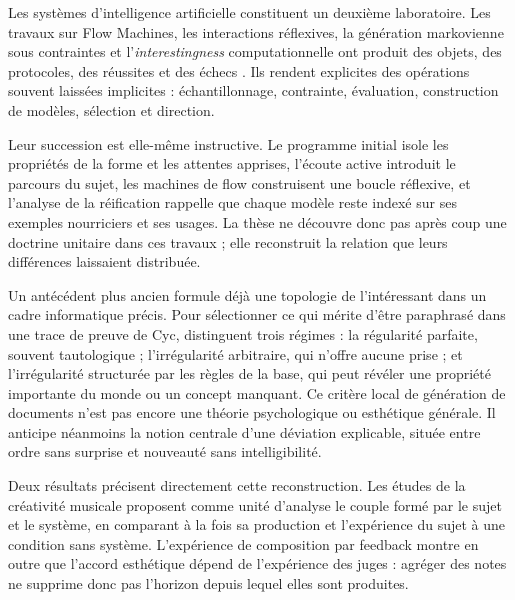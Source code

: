 \documentclass[11pt,a4paper]{article}
\begin{document}
Les systèmes d'intelligence artificielle constituent un deuxième laboratoire.
Les travaux sur Flow Machines, les interactions réflexives, la génération
markovienne sous contraintes et l'\emph{interestingness} computationnelle ont
produit des objets, des protocoles, des réussites et des échecs
\parencite{pachet1999surprising,pachet1999active,pachet1999programs,pachet2000melodie,
pachet2002continuatorinteraction,pachet2004flowmachines,pachet2004reification,
pachet2004cybernetic,pachet2004childrenreflect,addessi2005experiments,
pachet2006clefs,pachet2006creativity,pachet2006reflective,pachet2008machines,
jones2009stimulating,pachet2006interactionsreflexives,addessi2006flowmachine,
aucouturier2002similarity,pachetroy2008hitsong,pachet2011hitsong,
lerch2011closedloop,
milipachet1995regularity,pachet2012virtuosity,martin2016creativeprocess,
pachet2021assisted,pachet2026markov}.
Ils rendent explicites des opérations souvent laissées implicites :
échantillonnage, contrainte, évaluation, construction de modèles, sélection et
direction.

Leur succession est elle-même instructive. Le programme initial isole les
propriétés de la forme et les attentes apprises, l'écoute active introduit le
parcours du sujet, les machines de flow construisent une boucle réflexive, et
l'analyse de la réification rappelle que chaque modèle reste indexé sur ses
exemples nourriciers et ses usages. La thèse ne découvre donc pas après coup une
doctrine unitaire dans ces travaux ; elle reconstruit la relation que leurs
différences laissaient distribuée.

Un antécédent plus ancien formule déjà une topologie de l'intéressant dans un
cadre informatique précis. Pour sélectionner ce qui mérite d'être paraphrasé
dans une trace de preuve de Cyc, \textcite{milipachet1995regularity} distinguent
trois régimes : la régularité parfaite, souvent tautologique ; l'irrégularité
arbitraire, qui n'offre aucune prise ; et l'irrégularité structurée par les
règles de la base, qui peut révéler une propriété importante du monde ou un
concept manquant. Ce critère local de génération de documents n'est pas encore
une théorie psychologique ou esthétique générale. Il anticipe néanmoins la
notion centrale d'une déviation explicable, située entre ordre sans surprise et
nouveauté sans intelligibilité.

Deux résultats précisent directement cette reconstruction. Les études de la
créativité musicale proposent comme unité d'analyse le couple formé par le sujet
et le système, en comparant à la fois sa production et l'expérience du sujet à
une condition sans système. L'expérience de composition par feedback montre en
outre que l'accord esthétique dépend de l'expérience des juges : agréger des
notes ne supprime donc pas l'horizon depuis lequel elles sont produites.
\end{document}
